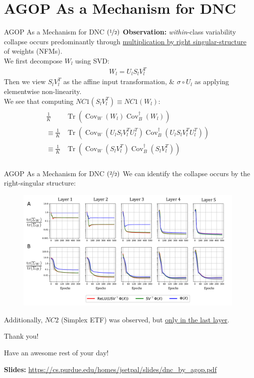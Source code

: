 \documentclass{beamer}
\DeclareMathOperator{\Tr}{Tr}
\DeclareMathOperator{\Cov}{Cov}
\begin{document}
\section{AGOP As a Mechanism for DNC}
\begin{frame}{AGOP As a Mechanism for DNC $(\nicefrac{1}{2})$}
	\textbf{Observation:} \textit{within}-class variability collapse occurs predominantly through \underline{multiplication by right singular-structure} of weights (NFMs). \pause \newline \\

	We first decompose $W_l$ using SVD:
	\begin{gather}
		W_l = U_l S_l V_l^T
	\end{gather} \pause
	Then we view $S_l V_l^T$ as the affine input transformation, \& $\sigma \circ U_l$ as applying elementwise non-linearity. \pause \newline \\

	We see that computing $NC1(S_l V_l^T) \equiv NC1(W_l)$:
	\begin{align}
		\begin{split}
			\frac{1}{K} &\Tr\left( \Cov_W(W_l) \Cov_B^{\dagger}(W_l) \right) \\
			\equiv \frac{1}{K} &\Tr\left( \Cov_W(U_lS_lV_l^TU_l^T) \Cov_B^{\dagger}(U_lS_lV_l^TU_l^T) \right) \\
			\equiv \frac{1}{K} &\Tr\left( \Cov_W(S_lV_l^T) \Cov_B^{\dagger}(S_lV_l^T) \right) \\
		\end{split}
	\end{align}
\end{frame}

\begin{frame}{AGOP As a Mechanism for DNC $(\nicefrac{2}{2})$}
	We can identify the collapse occurs by the right-singular structure:
	\vspace{-.8em}
	\begin{figure}[H]
		\centering
		\includegraphics[width=\textwidth]{img/NC1.pdf}
	\end{figure} \pause
	\vspace{-1em}
	Additionally, $NC2$ (Simplex ETF) was observed, but \underline{only in the last layer}.
\end{frame}

\begin{frame}{Thank you!}
	\begin{center}
		Have an awesome rest of your day!
	\end{center}
	\begin{center}
		\textbf{Slides:} {\small \url{https://cs.purdue.edu/homes/jsetpal/slides/dnc_by_agop.pdf}}
	\end{center}
\end{frame}
\end{document}
